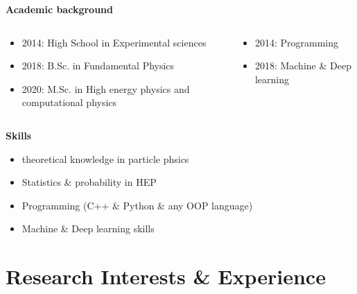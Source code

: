 \documentclass[11pt,aspectratio=169]{beamer}
\begin{document}
\begin{frame}{\underline{\secname}}
	
	\begin{center}
		\textbf{Academic background}
	\end{center}
	\begin{columns}
		\begin{column}{0.5\linewidth}
	
	\begin{itemize} 			  \setlength\itemsep{0em}

		\item 2014: High School in Experimental sciences
		\item 2018: B.Sc. in Fundamental Physics
		
		\item 2020: M.Sc. in High energy physics and computational physics
	\end{itemize}	

			\end{column}
		
	\pause	
		\begin{column}{0.5\linewidth}
		
	\begin{itemize}			  \setlength\itemsep{0em}

		\item 2014: Programming
		\item 2018: Machine \& Deep learning
	\end{itemize}
			\end{column}
	\end{columns}
	
	\begin{center}
	\textbf{Skills}
\end{center}	
	\begin{itemize}			  \setlength\itemsep{0em}
\item
theoretical knowledge in particle phsics
\item
Statistics \& probability in HEP 
\item
Programming (C++ \& Python \& any OOP language)
\item
Machine \& Deep learning skills  
		\end{itemize}

\end{frame}




\section{Research Interests \& Experience}
\end{document}
